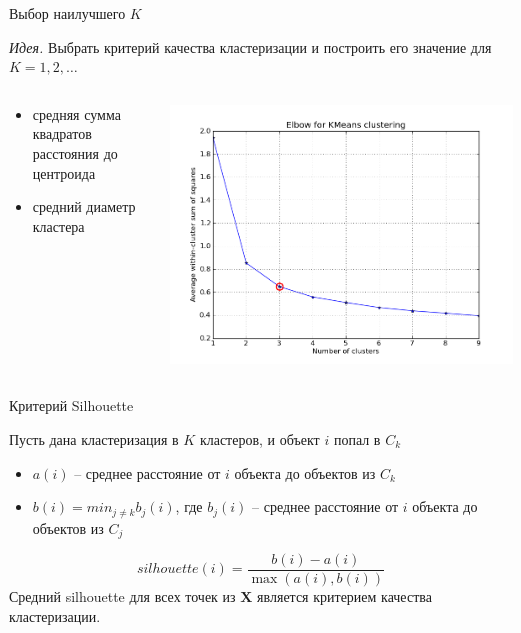 \documentclass[10pt,a4paper]{beamer}
\begin{document}
\begin{frame}{Выбор наилучшего $K$}

{\it Идея.} Выбрать критерий качества кластеризации и построить его значение для $K = 1, 2, \ldots$

\begin{columns}[C]
    \begin{column}{.5\textwidth} 
    \begin{itemize}
	\item средняя сумма квадратов расстояния до центроида
	\item средний диаметр кластера
	\end{itemize} 		    
    \end{column}
    \begin{column}{.5\textwidth}
    \vspace{1em}
    \includegraphics[scale=0.3]{images/elbow.png}    
    \end{column}
\end{columns}

\end{frame}


\begin{frame}{Критерий Silhouette}

Пусть дана кластеризация в $K$ кластеров, и объект $i$ попал в $C_k$

\vspace{1em}
\begin{itemize}
\item $a(i)$ -- среднее расстояние от $i$ объекта до объектов из $C_k$
\item $b(i) = min_{j \neq k} b_j(i)$,  где $b_j(i)$ -- среднее расстояние от $i$ объекта до объектов из $C_j$
\end{itemize}
\[
silhouette(i) = \frac{b(i) - a(i)}{\max(a(i), b(i))}
\]
Средний silhouette для всех точек из $\mathbf{X}$ является критерием качества кластеризации.

\end{frame}
\end{document}
